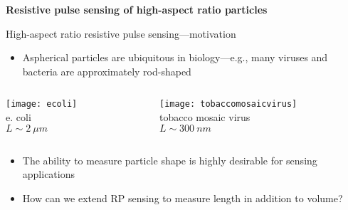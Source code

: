 

\begin{frame}[c]{}
	\begin{center}
		\textbf{Resistive pulse sensing of high-aspect ratio particles}
	\end{center}
\end{frame}






\begin{frame}[c]{High-aspect ratio resistive pulse sensing---motivation}
 	\begin{itemize}
 		\item Aspherical particles are ubiquitous in biology---e.g., many viruses and bacteria are approximately rod-shaped
 	\end{itemize}


	\begin{columns}[t]
		\begin{column}[T]{2.5in}
			{\centering
				\texttt{[image: ecoli]} \\
				e. coli \\
				$L\sim \SI{2}{\mu m}$ \\
				\par
			}
		\end{column}
		
		
		\begin{column}[T]{2.5in}
			{\centering
				\texttt{[image: tobaccomosaicvirus]} \\
				tobacco mosaic virus \\
				$L\sim \SI{300}{nm}$ \\
				\par
			}
		\end{column}
	

	\end{columns}

	\begin{itemize}
		\item The ability to measure particle shape is highly desirable for sensing applications
 		\item How can we extend RP sensing to measure length in addition to volume?
 	\end{itemize}
	

\end{frame}




